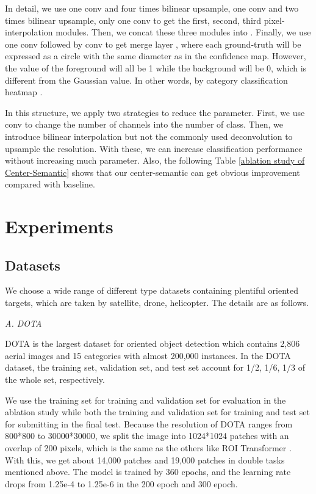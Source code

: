 \documentclass[10pt,twocolumn]{article}
\begin{document}
In detail, we use one  conv and four times bilinear upsample, one  conv and two times bilinear upsample, only one  conv to get the first, second, third pixel-interpolation modules. Then, we concat these three modules into . Finally, we use one  conv followed by  conv to get merge layer , where each ground-truth will be expressed as a circle with the same diameter as in the confidence map. However, the value of the foreground will all be 1 while the background will be 0, which is different from the Gaussian value. In other words, by category classification heatmap . 



In this structure, we apply two strategies to reduce the parameter. First, we use  conv to change the number of channels into the number of class. Then, we introduce bilinear interpolation but not the commonly used deconvolution to upsample the resolution. With these, we can increase classification performance without increasing much parameter. Also, the following Table \ref{ablation study of Center-Semantic} shows that our center-semantic can get obvious improvement compared with baseline.

\section{Experiments}\label{experiments}

\subsection{Datasets}

We choose a wide range of different type datasets containing plentiful oriented targets, which are taken by satellite, drone, helicopter. The details are as follows.

\emph{A. DOTA}\label{DOTA}

DOTA \cite{xia2018dota} is the largest dataset for oriented object detection which contains 2,806 aerial images and 15 categories with almost 200,000 instances. In the DOTA dataset, the training set, validation set, and test set account for 1/2, 1/6, 1/3 of the whole set, respectively. 

We use the training set for training and validation set for evaluation in the ablation study while both the training and validation set for training and test set for submitting in the final test. Because the resolution of DOTA ranges from 800*800 to 30000*30000, we split the image into 1024*1024 patches with an overlap of 200 pixels, which is the same as the others like ROI Transformer \cite{ding2019learning}. With this, we get about 14,000 patches and 19,000 patches in double tasks mentioned above. The model is trained by 360 epochs, and the learning rate drops from 1.25e-4 to 1.25e-6 in the 200 epoch and 300 epoch.
\end{document}
